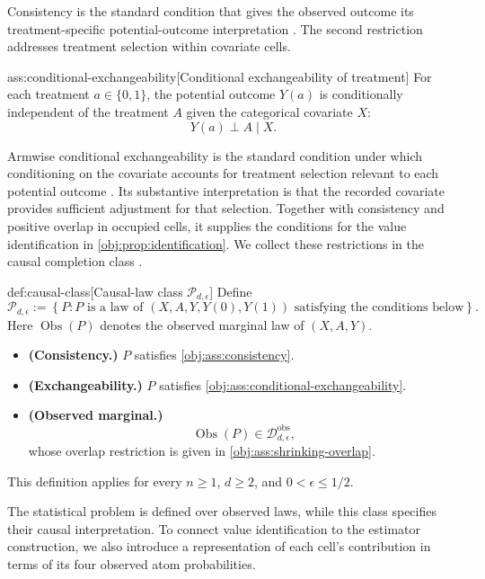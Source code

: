 \documentclass[11pt]{article}
\begin{document}
Consistency is the standard condition that gives the observed outcome its treatment-specific potential-outcome interpretation \citep{ZengBalakrishnanHanKennedy2024Discrete}. The second restriction addresses treatment selection within covariate cells.

\begin{assumptionv}{ass:conditional-exchangeability}[Conditional exchangeability of treatment]
For each treatment \(a\in\{0,1\}\), the potential outcome \(Y(a)\) is conditionally independent of the treatment \(A\) given the categorical covariate \(X\):
\[
Y(a)\perp A\mid X.
\]
\end{assumptionv}

Armwise conditional exchangeability is the standard condition under which conditioning on the covariate accounts for treatment selection relevant to each potential outcome \citep{ZengBalakrishnanHanKennedy2024Discrete}. Its substantive interpretation is that the recorded covariate provides sufficient adjustment for that selection. Together with consistency and positive overlap in occupied cells, it supplies the conditions for the value identification in \cref{obj:prop:identification}. We collect these restrictions in the causal completion class .

\begin{definitionv}{def:causal-class}[Causal-law class \(\mathcal P_{d,\epsilon}\)]
Define
\[
\mathcal P_{d,\epsilon}
:=
\left\{
P:
P\text{ is a law of }(X,A,Y,Y(0),Y(1))
\text{ satisfying the conditions below}
\right\}.
\]
Here \(\operatorname{Obs}(P)\) denotes the observed marginal law of \((X,A,Y)\).
\begin{itemize}
\item \textbf{(Consistency.)} \(P\) satisfies \cref{obj:ass:consistency}.
\item \textbf{(Exchangeability.)} \(P\) satisfies \cref{obj:ass:conditional-exchangeability}.
\item \textbf{(Observed marginal.)}
\[
\operatorname{Obs}(P)\in\mathcal D_{d,\epsilon}^{\mathrm{obs}},
\]
whose overlap restriction is given in \cref{obj:ass:shrinking-overlap}.
\end{itemize}
This definition applies for every \(n\ge1\), \(d\ge2\), and \(0<\epsilon\le1/2\).
\end{definitionv}

The statistical problem is defined over observed laws, while this class specifies their causal interpretation. To connect value identification to the estimator construction, we also introduce a representation of each cell's contribution in terms of its four observed atom probabilities.
\end{document}
